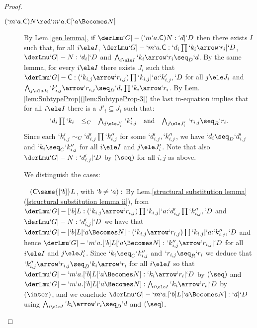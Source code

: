 \documentclass{CSML}
\begin{document}
\begin{proof}
\begin{description}
 \item [{$ (`m `a . \Cmd ) N \red `m `a . \Cmd [ `a\Becomes N ] $}]
By Lem.\skp\ref{gen lemma}, if $\derLmu `G |- {(`m `a . \Cmd ) N} : `d | `D $ then there exists $I$ such that, for all $i\ele I$, $\derLmu `G |- {`m `a . \Cmd} : `d_i\prod `k_i\arrow `r_i | `D $, $\derLmu `G |- N : `d_i | `D $ and $\bigwedge_{i\ele I} `k_i\arrow `r_i \seq_D `d$. 
By the same lemma, for every $i \ele I$ there exists $J_i$ such that $\derLmu `G |- {\Cmd} : (`k_{i,j}\arrow `r_{i,j})\prod `k_{i,j} | `a{:}`k'_{i,j},`D $ for all $j\ele J_i$ and $\bigwedge_{j\ele J_i} `k'_{i,j}\arrow `r_{i,j} \seq_D `d_i\prod `k_i\arrow `r_i $.
By Lem.\skp\ref{lem:SubtypeProp}\skp(\ref{lem:SubtypeProp-3}) the last in-equation implies that for all $i\ele I$ there is a $J'_i \subseteq J_i$ such that:
 \[ \begin{array}{rcl@{\quad}c@{\quad}rcl}
`d_i\prod `k_i &\leq_C& \bigwedge_{j\ele J'_i}\, `k'_{i,j} 
	& \textrm{and} & 
\bigwedge_{j\ele J'_i}\,`r_{i,j} \seq_R `r_i.
 \end{array} \]
Since each $`k'_{i,j} \sim_C `d'_{i,j}\prod `k''_{i,j}$ for some $`d'_{i,j}, `k''_{i,j}$, we have $`d_i \seq_D `d'_{i,j}$ and $`k_i \seq_C `k''_{i,j}$ for all $i\ele I$ and $j\ele J'_i$. Note that also $\derLmu `G |- N : `d'_{i,j} | `D $ by $(\seq)$ for all $i,j$ as above.
	
We distinguish the cases: 

~\kern-10mm $( \Cmd \same {[`b]}L$, with $`b \neq `a ) : $ 
By Lem.\skp\ref{structural substitution lemma}\skp(\ref{structural substitution lemma ii}),
from $\derLmu `G |- {{[`b]}L} : (`k_{i,j}\arrow `r_{i,j})\prod `k_{i,j} | `a{:} `d'_{i,j}\prod `k''_{i,j},`D $ and 
$\derLmu `G |- N : `d'_{i,j} | `D $ we have that
$\derLmu `G |- {{[`b]}L[`a \Becomes N]} : (`k_{i,j}\arrow `r_{i,j})\prod `k_{i,j} | `a{:} `k''_{i,j},`D $ and
hence $\derLmu `G |- {`m `a. {[`b]}L[`a \Becomes N]} : `k''_{i,j}\arrow `r_{i,j} | `D $ for all $i\ele I$ and $j\ele J'_i$.
Since $`k_i \seq_C `k''_{i,j}$ and $`r_{i,j} \seq_R `r_i$ we deduce that $`k''_{i,j}\arrow `r_{i,j} \seq_D `k_i\arrow `r_i$
for all $i\ele I$ so that $\derLmu `G |- {`m `a. {[`b]}L[`a \Becomes N]} : `k_i\arrow `r_i | `D $ by $(\seq)$
and $\derLmu `G |- {`m `a. {[`b]}L[`a \Becomes N]} : \bigwedge_{i\ele I}`k_i\arrow `r_i | `D $ by $(\inter)$,
and we conclude $\derLmu `G |- {`m `a. {[`b]}L[`a \Becomes N]} : `d | `D $ using 
$\bigwedge_{i\ele I} `k_i\arrow `r_i \seq_D `d$ and $(\seq)$.


\end{description}
\end{proof}
\end{document}
